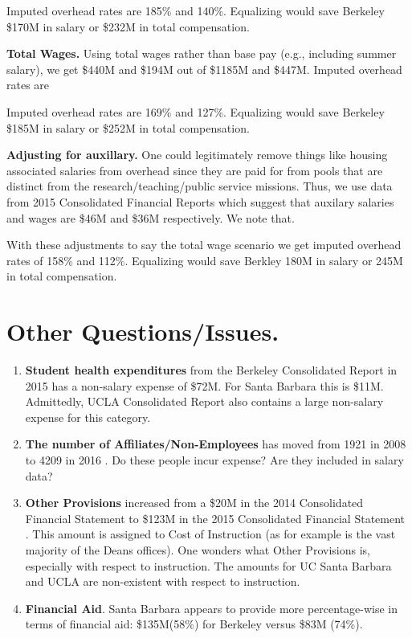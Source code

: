 \documentclass{article}
\begin{document}
Imputed overhead rates are 185\% and 140\%.  Equalizing
would save Berkeley \$170M in salary or \$232M in total
compensation. 

{\bf Total Wages.} Using total wages rather than base pay
(e.g., including summer salary), we get \$440M and \$194M
out of \$1185M and \$447M.  Imputed overhead rates are 

Imputed overhead rates are 169\% and 127\%.  Equalizing
would save Berkeley \$185M in salary or \$252M in total
compensation. 

{\bf Adjusting for auxillary.} One could legitimately
remove things like housing associated salaries from overhead since
they are paid for from pools that are distinct
from the research/teaching/public service missions.
Thus, we use data from 2015 Consolidated Financial
Reports \cite{UCSB-consolidated,UCB-consolidated}
which suggest that auxilary salaries and wages
are \$46M and \$36M respectively. We note that.

With these adjustments to say the total wage
scenario we get imputed overhead rates of
158\% and 112\%.  Equalizing would save
Berkley 180M in salary or 245M in total
compensation.

\section{Other Questions/Issues.}
\label{sec:healthcare}

\begin{enumerate}
\item
{\bf Student health expenditures} from the Berkeley Consolidated
Report \cite{UCB-consolidated} in 2015 has a non-salary expense of
\$72M.  For Santa Barbara \cite{UCSB-consolidated} this is
\$11M. Admittedly, UCLA Consolidated Report \cite{UCLA-consolidated}
also contains a large non-salary expense for this category.

\item
{\bf The number of Affiliates/Non-Employees} has moved from 1921 in
2008 to 4209 in 2016 \cite{cal-answer-census}.  Do these people incur
expense? Are they included in salary data?

\item
{\bf Other Provisions} increased from a \$20M in the 2014 Consolidated
Financial Statement \cite{UCB-consolidated-14} to \$123M in the 2015
Consolidated Financial Statement \cite{UCB-consolidated}.  This amount
is assigned to Cost of Instruction (as for example is the vast
majority of the Deans offices).  One wonders what Other Provisions is,
especially with respect to instruction.  The amounts for UC Santa
Barbara and UCLA are non-existent with respect to instruction.

\item
{\bf Financial Aid}. Santa Barbara appears to provide more
percentage-wise in terms of financial aid: \$135M(58\%)
for Berkeley versus \$83M (74\%).  

\end{enumerate}
\end{document}
